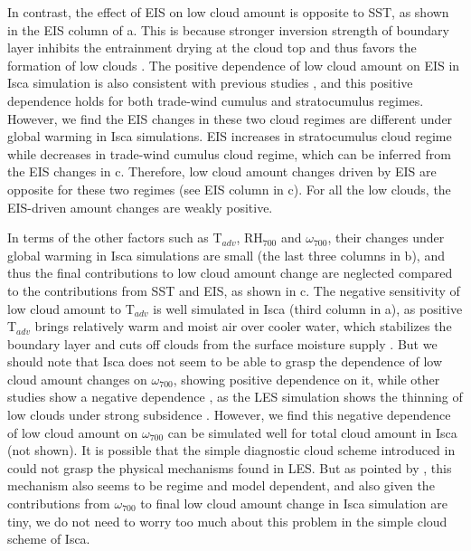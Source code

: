 In contrast, the effect of EIS on low cloud amount is opposite to SST, as shown in the EIS column of a. This is because stronger inversion strength of boundary layer inhibits the entrainment drying at the cloud top and thus favors the formation of low clouds \cite[e.g.,][]{Bretherton2015,Scott2020}. The positive dependence of low cloud amount on EIS in Isca simulation is also consistent with previous studies \citep{Qu2015positive,Myers2021,Cesana2021}, and this positive dependence holds for both trade-wind cumulus and stratocumulus regimes. However, we find the EIS changes in these two cloud regimes are different under global warming in Isca simulations. EIS increases in stratocumulus cloud regime while decreases in trade-wind cumulus cloud regime, which can be inferred from the EIS changes in c. Therefore, low cloud amount changes driven by EIS are opposite for these two regimes (see EIS column in c). For all the low clouds, the EIS-driven amount changes are weakly positive.

In terms of the other factors such as T$_{adv}$, RH$_{700}$ and $\omega_{700}$, their changes under global warming in Isca simulations are small (the last three columns in b), and thus the final contributions to low cloud amount change are neglected compared to the contributions from SST and EIS, as shown in c. The negative sensitivity of low cloud amount to T$_{adv}$ is well simulated in Isca (third column in a), as positive T$_{adv}$ brings relatively warm and moist air over cooler water, which stabilizes the boundary layer and cuts off clouds from the surface moisture supply \citep{Scott2020}. But we should note that Isca does not seem to be able to grasp the dependence of low cloud amount changes on $\omega_{700}$, showing positive dependence on it, while other studies show a negative dependence \citep[e.g.,][]{Scott2020,Zelinka2020causes}, as the LES simulation shows the thinning of low clouds under strong subsidence \citep{Bretherton2015}. However, we find this negative dependence of low cloud amount on $\omega_{700}$ can be simulated well for total cloud amount in Isca (not shown). It is possible that the simple diagnostic cloud scheme introduced in  could not grasp the physical mechanisms found in LES. But as pointed by \cite{McCoy2017change}, this mechanism also seems to be regime and model dependent, and also given the contributions from $\omega_{700}$ to final low cloud amount change in Isca simulation are tiny, we do not need to worry too much about this problem in the simple cloud scheme of Isca.

